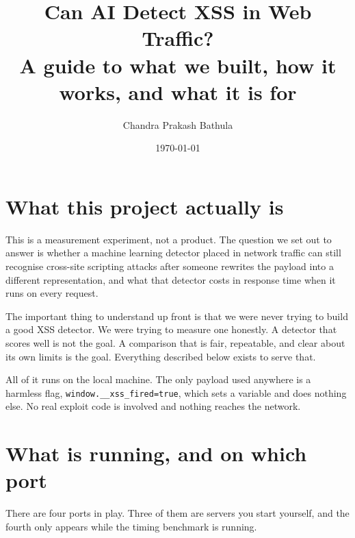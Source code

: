 \documentclass[11pt,a4paper]{article}
\title{\vspace{-1.6cm}\textbf{Can AI Detect XSS in Web Traffic?}\\[0.2em]
\large A guide to what we built, how it works, and what it is for}
\author{\normalsize Chandra Prakash Bathula}
\date{\normalsize \today}
\newcommand{\tc}[1]{\texttt{\small #1}}
\begin{document}
\maketitle
\vspace{-0.8cm}

\section{What this project actually is}

This is a measurement experiment, not a product. The question we set out to answer is
whether a machine learning detector placed in network traffic can still recognise
cross-site scripting attacks after someone rewrites the payload into a different
representation, and what that detector costs in response time when it runs on every
request.

The important thing to understand up front is that we were never trying to build a good
XSS detector. We were trying to measure one honestly. A detector that scores well is not
the goal. A comparison that is fair, repeatable, and clear about its own limits is the
goal. Everything described below exists to serve that.

All of it runs on the local machine. The only payload used anywhere is a harmless flag,
\tc{window.\_\_xss\_fired=true}, which sets a variable and does nothing else. No real
exploit code is involved and nothing reaches the network.

\section{What is running, and on which port}

There are four ports in play. Three of them are servers you start yourself, and the fourth
only appears while the timing benchmark is running.
\end{document}
